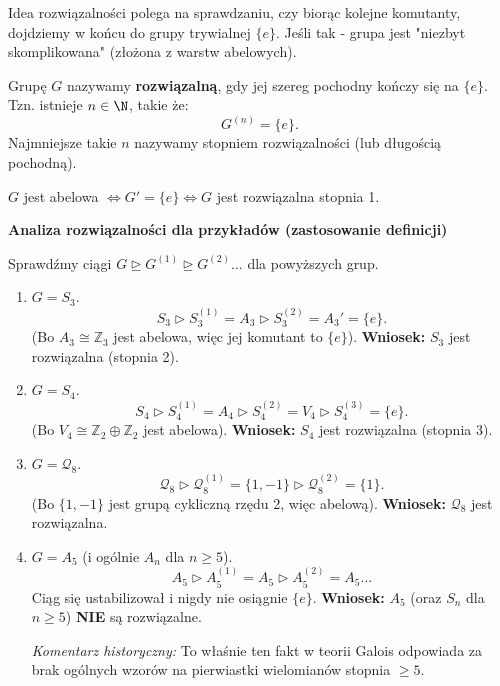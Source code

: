 Idea rozwiązalności polega na sprawdzaniu, czy biorąc kolejne komutanty, dojdziemy w końcu do grupy trywialnej $\{e\}$. Jeśli tak - grupa jest "niezbyt skomplikowana" (złożona z warstw abelowych).

\begin{definition}
	Grupę $G$ nazywamy \textbf{rozwiązalną}, gdy jej szereg pochodny kończy się na $\{e\}$.
	Tzn. istnieje $n\in \N$, takie że:
	\[ G^{(n)} = \{e\}. \]
	Najmniejsze takie $n$ nazywamy stopniem rozwiązalności (lub długością pochodną).
\end{definition} 

\begin{remark}
	$G$ jest abelowa $\iff G' = \{e\} \iff G$ jest rozwiązalna stopnia 1.
\end{remark} 

\textbf{Analiza rozwiązalności dla przykładów (zastosowanie definicji)}

Sprawdźmy ciągi $G \unrhd G^{(1)} \unrhd G^{(2)} \dots$ dla powyższych grup.

\begin{enumerate}[label=\arabic*)]
	\item $G = S_3$.
	\[ S_3 \triangleright S_3^{(1)} = A_3 \triangleright S_3^{(2)} = A_3' = \{e\}. \]
	(Bo $A_3 \cong \mathbb{Z}_3$ jest abelowa, więc jej komutant to $\{e\}$).
	\textbf{Wniosek:} $S_3$ jest rozwiązalna (stopnia 2).

	\item $G = S_4$.
	\[ S_4 \triangleright S_4^{(1)} = A_4 \triangleright S_4^{(2)} = V_4 \triangleright S_4^{(3)} = \{e\}. \]
	(Bo $V_4 \cong \mathbb{Z}_2 \oplus \mathbb{Z}_2$ jest abelowa).
	\textbf{Wniosek:} $S_4$ jest rozwiązalna (stopnia 3).

	\item $G = \mathcal{Q}_8$.
	\[ \mathcal{Q}_8 \triangleright \mathcal{Q}_8^{(1)} = \{1, -1\} \triangleright \mathcal{Q}_8^{(2)} = \{1\}. \]
	(Bo $\{1, -1\}$ jest grupą cykliczną rzędu 2, więc abelową).
	\textbf{Wniosek:} $\mathcal{Q}_8$ jest rozwiązalna.

	\item $G = A_5$ (i ogólnie $A_n$ dla $n \ge 5$).
	\[ A_5 \triangleright A_5^{(1)} = A_5 \triangleright A_5^{(2)} = A_5 \dots \]
	Ciąg się ustabilizował i nigdy nie osiągnie $\{e\}$.
	\textbf{Wniosek:} $A_5$ (oraz $S_n$ dla $n \ge 5$) \textbf{NIE} są rozwiązalne.
	
	\textit{Komentarz historyczny:} To właśnie ten fakt w teorii Galois odpowiada za brak ogólnych wzorów na pierwiastki wielomianów stopnia $\ge 5$.
\end{enumerate}

